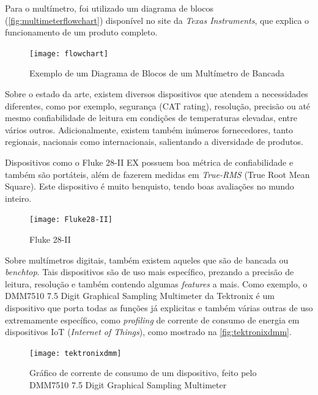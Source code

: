 Para o multímetro, foi utilizado um diagrama de blocos (\autoref{fig:multimeterflowchart}) disponível no site da \textit{Texas Instruments}, que explica o funcionamento de um produto completo.

\begin{figure}[h]%
    \caption{Exemplo de um Diagrama de Blocos de um Multímetro de Bancada}%
    \label{fig:multimeterflowchart}%
    \texttt{[image: flowchart]}%
\end{figure}

Sobre o estado da arte, existem diversos dispositivos que atendem a necessidades diferentes, como por exemplo, segurança (CAT rating), resolução, precisão ou até mesmo confiabilidade de leitura em condições de temperaturas elevadas, entre vários outros. Adicionalmente, existem também inúmeros fornecedores, tanto regionais, nacionais como internacionais, salientando a diversidade de produtos.

Dispositivos como o Fluke 28-II EX possuem boa métrica de confiabilidade e também são portáteis, além de fazerem medidas em \textit{True-RMS} (True Root Mean Square). Este dispositivo é muito benquisto, tendo boas avaliações no mundo inteiro.

\begin{figure}[htb]%
    \caption{Fluke 28-II}%
    \label{fig:Fluke28-II}%
    \texttt{[image: Fluke28-II]}%
\end{figure}

Sobre multímetros digitais, também existem aqueles que são de bancada ou \textit{benchtop}. Tais dispositivos são de uso mais específico, prezando a precisão de leitura, resolução e também contendo algumas \textit{features} a mais. Como exemplo, o DMM7510 7.5 Digit Graphical Sampling Multimeter da Tektronix é um dispositivo que porta todas as funções já explicitas e também várias outras de uso extremamente específico, como \textit{profiling} de corrente de consumo de energia em dispositivos \gls{IoT} (\textit{Internet of Things}), como mostrado na \autoref{fig:tektronixdmm}.

\begin{figure}[htb]%
    \caption{Gráfico de corrente de consumo de um dispositivo, feito pelo DMM7510 7.5 Digit Graphical Sampling Multimeter}%
    \label{fig:tektronixdmm}%
    \texttt{[image: tektronixdmm]}%
\end{figure}

